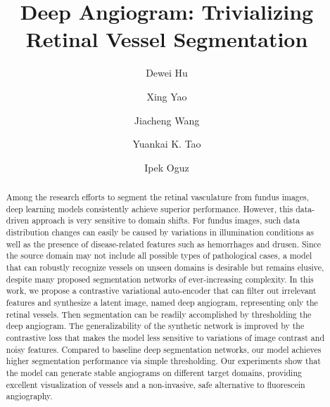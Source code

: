 \documentclass[]{spie}  %
\title{Deep Angiogram: Trivializing Retinal Vessel Segmentation}
\author[a]{Dewei Hu}
\author[b]{Xing Yao}
\author[b]{Jiacheng Wang}
\author[c]{Yuankai K. Tao}
\author[b]{Ipek Oguz}
\affil[a]{Vanderbilt University, Dept. of Electrical and Computer Engineering}
\affil[b]{Vanderbilt University, Dept. of Computer Science}
\affil[c]{Vanderbilt University, Dept. of Biomedical Engineering, Nashville, TN, USA}
\begin{document}
 
\maketitle

\begin{abstract}

Among the research efforts to segment the retinal vasculature from fundus images, deep learning models consistently achieve superior performance. However, this data-driven approach is very sensitive to domain shifts. For fundus images, such data distribution changes can easily be caused by variations in illumination conditions as well as the presence of disease-related features such as hemorrhages and drusen. Since the source domain may not include all possible types of pathological cases, a model that can robustly recognize vessels on unseen domains is desirable but remains elusive, despite many proposed segmentation networks of ever-increasing complexity. In this work, we propose a contrastive variational auto-encoder that can filter out irrelevant features and synthesize a latent image, named deep angiogram, representing only the retinal vessels. Then segmentation can be readily accomplished by thresholding the deep angiogram. The generalizability of the synthetic network is improved by the contrastive loss that makes the model less sensitive to variations of image contrast and noisy features. Compared to baseline deep segmentation networks, our model achieves higher segmentation performance via simple thresholding. Our experiments show that the model can generate stable angiograms on different target domains, providing excellent visualization of vessels and a non-invasive, safe alternative to fluorescein angiography. 

\end{abstract}

\end{document}
